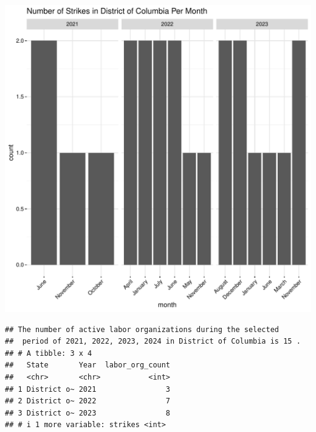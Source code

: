\documentclass[11pt]{article}\usepackage[]{graphicx}\usepackage[]{xcolor}
\makeatletter
\newenvironment{kframe}{%
 \def\at@end@of@kframe{}%
 \ifinner\ifhmode%
  \def\at@end@of@kframe{\end{minipage}}%
  \begin{minipage}{\columnwidth}%
 \fi\fi%
 \def\FrameCommand##1{\hskip\@totalleftmargin \hskip-\fboxsep
 \colorbox{shadecolor}{##1}\hskip-\fboxsep
     \hskip-\linewidth \hskip-\@totalleftmargin \hskip\columnwidth}%
 \MakeFramed {\advance\hsize-\width
   \@totalleftmargin\z@ \linewidth\hsize
   \@setminipage}}%
 {\par\unskip\endMakeFramed%
 \at@end@of@kframe}
\newenvironment{knitrout}{}{} %
\makeatother
\begin{document}
\begin{knitrout}
\color{fgcolor}

{\centering \includegraphics[width=0.7\linewidth]{figure/calling_the_ggplots_for_DC-1} 

}


\begin{kframe}\begin{verbatim}
## The number of active labor organizations during the selected 
##  period of 2021, 2022, 2023, 2024 in District of Columbia is 15 .
## # A tibble: 3 x 4
##   State       Year  labor_org_count
##   <chr>       <chr>           <int>
## 1 District o~ 2021                3
## 2 District o~ 2022                7
## 3 District o~ 2023                8
## # i 1 more variable: strikes <int>
\end{verbatim}
\end{kframe}
\end{knitrout}
\end{document}
